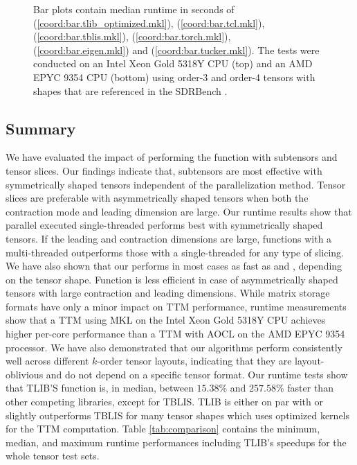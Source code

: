 \begin{figure*}[ht]


\caption%
{%
\footnotesize
Bar plots contain median runtime in seconds of %
 (\ref{coord:bar.tlib_optimized.mkl}), %
 (\ref{coord:bar.tcl.mkl}), %
 (\ref{coord:bar.tblis.mkl}), %
 (\ref{coord:bar.torch.mkl}), %
 (\ref{coord:bar.eigen.mkl}) and %
 (\ref{coord:bar.tucker.mkl}). 
The tests were conducted on an Intel Xeon Gold 5318Y CPU (top) and an AMD EPYC 9354 CPU (bottom) using order-3 and order-4 tensors with shapes that are referenced in the SDRBench \cite{zhao:2020:sdrbench}. 
}
\label{fig:performance-sdr.comparison}
\end{figure*}



\subsection{Summary}
We have evaluated the impact of performing the  function with subtensors and tensor slices.
Our findings indicate that, subtensors are most effective with symmetrically shaped tensors independent of the parallelization method. 
Tensor slices are preferable with asymmetrically shaped tensors when both the contraction mode and leading dimension are large.
Our runtime results show that parallel executed single-threaded  performs best with symmetrically shaped tensors.
If the leading and contraction dimensions are large, functions with a multi-threaded  outperforms those with a single-threaded  for any type of slicing.
We have also shown that our  performs in most cases as fast as  and , depending on the tensor shape.
Function  is less efficient in case of asymmetrically shaped tensors with large contraction and leading dimensions.
While matrix storage formats have only a minor impact on TTM performance, runtime measurements show that a TTM using MKL on the Intel Xeon Gold 5318Y CPU achieves higher per-core performance than a TTM with AOCL on the AMD EPYC 9354 processor.
We have also demonstrated that our algorithms perform consistently well across different $k$-order tensor layouts, indicating that they are layout-oblivious and do not depend on a specific tensor format.
Our runtime tests show that TLIB'S function  is, in median, between $15.38$\% and $257.58$\% faster than other competing libraries, except for TBLIS.
TLIB is either on par with or slightly outperforms TBLIS for many tensor shapes which uses optimized kernels for the TTM computation.
Table \ref{tab:comparison} contains the minimum, median, and maximum runtime performances including TLIB's speedups for the whole tensor test sets.

